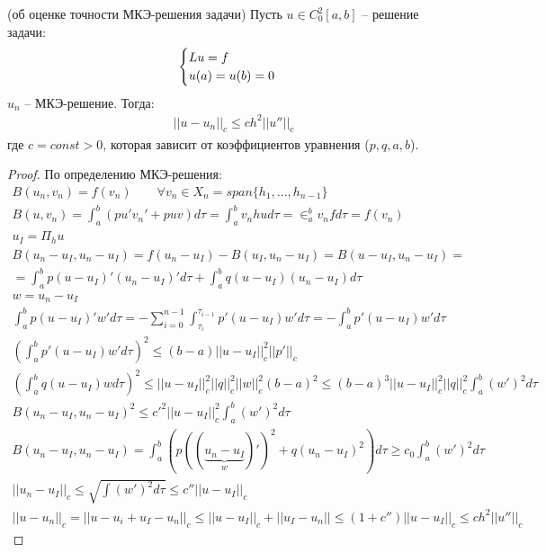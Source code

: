 \documentclass[__main__.tex]{subfiles}
\begin{document}
\begin{theorem}
	(об оценке точности МКЭ-решения задачи) Пусть $u \in C_0^2[a, b]$ -- решение задачи:
	\begin{gather*}
		\begin{cases}
			Lu=f \hfill \\
			u(a)=u(b)=0
		\end{cases}
	\end{gather*}
	$u_n$ -- МКЭ-решение. Тогда:
	\begin{gather*}
		||u-u_n||_c \leqslant ch^2||u''||_c
	\end{gather*}
	где $c=const>0$, которая зависит от коэффициентов уравнения ($p,q,a,b$).
\end{theorem}
\begin{proof}
	По определению МКЭ-решения:
	\begin{gather*}
		B(u_n, v_n)=f(v_n) \qquad \forall v_n \in X_n = span\{h_1, ... , h_{n-1}\}\\
		B(u,v_n) = \int_a^b (pu'v_n'+puv)d\tau = \int_a^b v_nhud\tau =\in_a^bv_n f d\tau = f(v_n)\\
		u_I =\Pi_h u \\
		B(u_n-u_I, u_n-u_I)=f(u_n-u_I)-B(u_I, u_n-u_I)=B(u-u_I, u_n-u_I)=\\
		=\int_a^bp(u-u_I)'(u_n-u_I)' d\tau + \int_a^b q(u-u_I)(u_n-u_I)d\tau\\
		w=u_n-u_I\\
		\int_a^b p(u-u_I)'w'd\tau = - \sum_{i=0}^{n-1}\int_{\tau_i}^{\tau_{i-1}} p'(u-u_I)w'd\tau = -\int_a^b p'(u-u_I)w'd\tau \\
		\left(\int_a^b p'(u-u_I)w'd\tau \right)^2 \leqslant (b-a)||u-u_I||^2_c||p'||_c\\
		\left(\int_a^b q(u-u_I)wd\tau \right)^2 \leqslant||u-u_I||^2_c||q||^2_c||w||^2_c(b-a)^2 \leqslant (b-a)^3 ||u-u_I||^2_c ||q||^2_c \int_a^b (w')^2d\tau \\
		B(u_n-u_I, u_n-u_I)^2 \leqslant c'^{2}||u-u_I||^2_c\int_a^b (w')^2d\tau\\
		B(u_n-u_I, u_n-u_I) = \int_a^b(p ((\underbrace{u_n-u_I}_w)')^2+q(u_n-u_I)^2)d\tau \geqslant c_0\int_a^b(w')^2d\tau\\
		||u_n-u_I||_c\leqslant \sqrt{\int (w')^2 d\tau} \leqslant c''||u-u_I||_c\\
		||u-u_n||_c=||u-u_i+u_I-u_n||_c \leqslant ||u-u_I||_c+||u_I-u_n||\leqslant (1+c'')||u-u_I||_c \leqslant ch^2||u''||_c
	\end{gather*}

\end{proof}
\end{document}
